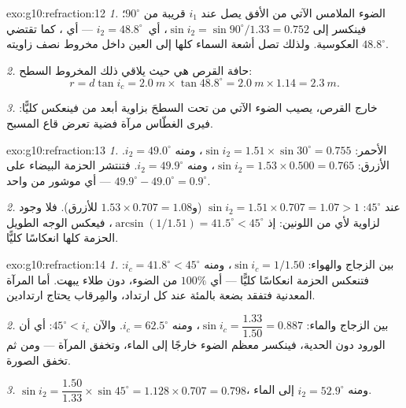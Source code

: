\begin{solution}{exo:g10:refraction:12}
\emph{1.} الضوء الملامس الآتي من الأفق يصل عند $i_1$ قريبة من
$90^\circ$؛ فينكسر إلى $\sin i_2 = \sin 90^\circ / 1.33 = 0.752$،
أي\ $i_2 = 48.8^\circ$ --- أي ، كما تقتضي
العكوسية. ولذلك تصل أشعة السماء كلها إلى العين داخل مخروط
نصف زاويته $48.8^\circ$.

\emph{2.} حافة القرص هي حيث يلاقي ذلك المخروط السطح:
\[
r = d \tan i_c = \qty{2.0}{m} \times \tan 48.8^\circ
= \qty{2.0}{m} \times 1.14 = \qty{2.3}{m}.
\]

\emph{3.} خارج القرص، يصيب الضوء الآتي من تحت السطحَ بزاوية أبعد
من  فينعكس كليًّا: فيرى الغطّاس مرآة
فضية تعرض قاع المسبح.
\end{solution}

\begin{solution}{exo:g10:refraction:13}
\emph{1.} الأحمر: $\sin i_2 = 1.51 \times \sin 30^\circ = 0.755$، ومنه
$i_2 = 49.0^\circ$. الأزرق: $\sin i_2 = 1.53 \times 0.500 = 0.765$، ومنه
$i_2 = 49.9^\circ$. فتنتشر الحزمة البيضاء على
$49.9^\circ - 49.0^\circ = 0.9^\circ$ --- أي  موشور من 
واحد.

\emph{2.} عند $45^\circ$: $\sin i_2 = 1.51 \times 0.707 = 1.07 > 1$
(و$1.53 \times 0.707 = 1.08$ للأزرق). فلا وجود لزاوية 
لأي من اللونين: إذ 
$\arcsin(1/1.51) = 41.5^\circ < 45^\circ$، فيعكس الوجه الطويل الحزمة كلها
انعكاسًا كليًّا.
\end{solution}

\begin{solution}{exo:g10:refraction:14}
\emph{1.}  بين الزجاج والهواء: $\sin i_c = 1/1.50$، ومنه
$i_c = 41.8^\circ < 45^\circ$: فتنعكس الحزمة انعكاسًا كليًّا --- أي $100\%$
من الضوء، دون طلاء يبهت. أما المرآة المعدنية فتفقد بضعة
بالمئة عند كل ارتداد، والمِرقاب يحتاج ارتدادين.

\emph{2.} بين الزجاج والماء: $\sin i_c = \dfrac{1.33}{1.50} = 0.887$، ومنه
$i_c = 62.5^\circ$. والآن $45^\circ < i_c$: أي أن الورود دون
الحدية، فينكسر معظم الضوء خارجًا إلى الماء، وتخفق
المرآة --- ومن ثم تخفق الصورة.

\emph{3.} $\sin i_2 = \dfrac{1.50}{1.33} \times \sin 45^\circ
= 1.128 \times 0.707 = 0.798$، ومنه $i_2 = 52.9^\circ$ إلى الماء.
\end{solution}

